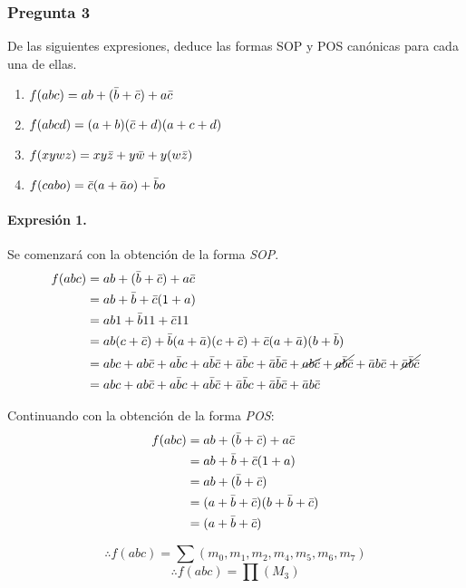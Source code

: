 \documentclass[../procedimientos.tex]{subfiles}
\begin{document}
\subsubsection*{Pregunta 3}
\begin{em}
  De las siguientes expresiones, deduce las formas SOP y POS canónicas para 
  cada una de ellas.
  \begin{enumerate}
    \item $f(abc) = ab + (\bar{b} + \bar{c}) + a \bar{c}$
    \item $f(abcd) = (a + b) (\bar{c} + d)(a + c + d)$
    \item $f(xywz) = x y \bar{z} + y \bar{w} + y (w \bar{z})$
    \item $f(cabo) = \bar{c} (a + \bar{a} o) + \bar{b} o$
  \end{enumerate}
\end{em}

\paragraph{Expresión 1.} Se comenzará con la obtención de la forma 
\textit{SOP}.
\begin{align*}
  f(abc) &= ab + (\bar{b} + \bar{c}) + a \bar{c}\\
  &= a b + \bar{b} + \bar{c} (1 + a)\\
  &= a b 1 + \bar{b} 1 1 + \bar{c} 1 1\\
  &= a b (c + \bar{c}) + \bar{b} (a + \bar{a}) (c + \bar{c}) + \bar{c} (a + \bar{a}) 
  (b + \bar{b})\\
  &= abc + ab\bar{c} + a\bar{b}c + a\bar{b}\bar{c} + \bar{a}\bar{b}c + 
  \bar{a}\bar{b}\bar{c} + \cancel{ab\bar{c}} + \cancel{a\bar{b}\bar{c}} + 
  \bar{a}b\bar{c} + \cancel{\bar{a}\bar{b}\bar{c}}\\
  &= abc + ab\bar{c} + a\bar{b}c + a\bar{b}\bar{c} + \bar{a}\bar{b}c + 
  \bar{a}\bar{b}\bar{c} + \bar{a}b\bar{c}
\end{align*}

Continuando con la obtención de la forma \textit{POS}:
\begin{align*}
  f(abc) &= ab + (\bar{b} + \bar{c}) + a \bar{c}\\
  &= ab + \bar{b} + \bar{c} (1 + a)\\
  &= ab + (\bar{b} + \bar{c})\\
  &= (a + \bar{b} + \bar{c}) (b + \bar{b} + \bar{c})\\
  &= (a + \bar{b} + \bar{c})
\end{align*}

\begin{equation*}
  \boxed{
    \therefore f(abc) = \sum (m_0, m_1, m_2, m_4, m_5, m_6, m_7)
  }
\end{equation*}
\begin{equation*}
  \boxed{
    \therefore f(abc) = \prod (M_3)
  }
\end{equation*}
\end{document}
